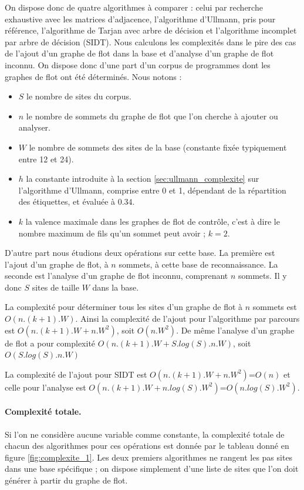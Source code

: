 On dispose donc de quatre algorithmes à comparer : celui par recherche exhaustive avec les matrices d'adjacence, l'algorithme d'Ullmann, pris pour référence, l'algorithme de Tarjan avec arbre de décision et l'algorithme incomplet par arbre de décision (SIDT).
Nous calculons les complexités dans le pire des cas de l'ajout d'un graphe de flot dans la base et d'analyse d'un graphe de flot inconnu.
On dispose donc d'une part d'un corpus de programmes dont les graphes de flot ont été déterminés.
Nous notons :
\begin{itemize}
 \item $S$ le nombre de sites du corpus.
 \item $n$ le nombre de sommets du graphe de flot que l'on cherche à ajouter ou analyser.
 \item $W$ le nombre de sommets des sites de la base (constante fixée typiquement entre 12 et 24).
 \item $h$ la constante introduite à la section \ref{sec:ullmann_complexite} sur l'algorithme d'Ullmann, comprise entre 0 et 1, dépendant de la répartition des étiquettes, et évaluée à $0.34$.
 \item $k$ la valence maximale dans les graphes de flot de contrôle, c'est à dire le nombre maximum de fils qu'un sommet peut avoir ; $k=2$.
\end{itemize}
D'autre part nous étudions deux opérations sur cette base.
La première est l'ajout d'un graphe de flot, à $n$ sommets, à cette base de reconnaissance.
La seconde est l'analyse d'un graphe de flot inconnu, comprenant $n$ sommets.
Il y donc $S$ sites de taille $W$ dans la base.

La complexité pour déterminer tous les sites d'un graphe de flot à $n$ sommets est $O(n.(k+1).W)$.
Ainsi la complexité de l'ajout pour l'algorithme par parcours est $O(n.(k+1).W+n.W^2)$, soit $O(n.W^2)$.
De même l'analyse d'un graphe de flot a pour complexité $O(n.(k+1).W+S.log(S).n.W)$, soit $O(S.log(S).n.W)$

La complexité de l'ajout pour SIDT est $O(n.(k+1).W+n.W^2)$=$O(n)$ et celle pour l'analyse est $O(n.(k+1).W+n.log(S).W^2)$=$O(n.log(S).W^2)$.

\paragraph{Complexité totale.}
Si l'on ne considère aucune variable comme constante, la complexité totale de chacun des algorithmes pour ces opérations est donnée par le tableau donné en figure \ref{fig:complexite_1}.
Les deux premiers algorithmes ne rangent les pas sites dans une base spécifique ; on dispose simplement d'une liste de sites que l'on doit générer à partir du graphe de flot.


